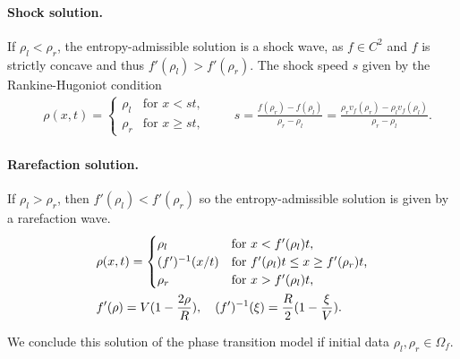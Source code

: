 \documentclass[10pt]{article}
\numberwithin{equation}{section}
\begin{document}
\paragraph{Shock solution.} If $\rho_l < \rho_r$, the entropy-admissible solution is a shock wave, as $f \in C^2$ and $f$ is strictly concave and thus $f'(\rho_l) > f'(\rho_r) $. The shock speed $s$ given by the Rankine-Hugoniot condition
\begin{align*}
    & \rho(x,t) = \begin{cases}
    \rho_l & \text{for $x < st$, } \\
    \rho_r & \text{for $x \geq st$, }
    \end{cases} 
    \quad \quad s = \frac{f(\rho_r) - f(\rho_l)}{\rho_r - \rho_l} = \frac{\rho_r v_f(\rho_r) -\rho_l v_f(\rho_l)}{\rho_r - \rho_l}.
\end{align*}

\paragraph{Rarefaction solution.} If $\rho_l > \rho_r$, then $f'(\rho_l) < f'(\rho_r) $ so the entropy-admissible solution is given by a rarefaction wave.
\begin{align*}
    & \rho(x,t) = \begin{cases}
    \rho_l & \text{for $x < f'(\rho_l)t$, } \\
    (f')^{-1}(x/t)  &  \text{for $ f'(\rho_l)t \leq x \geq f'(\rho_r)t$,} \\
     \rho_r & \text{for $x > f'(\rho_l)t$, }
    \end{cases} \\
    & f'(\rho) = V(1-\frac{2 \rho}{R}) , \quad  (f')^{-1}(\xi) = \frac{R}{2}(1-\frac{\xi}{V}). 
\end{align*}

We conclude this solution of the phase transition model if initial data $\rho_l, \rho_r \in \Omega_f$.

\begin{figure} \centering
    
\end{figure}
\end{document}
